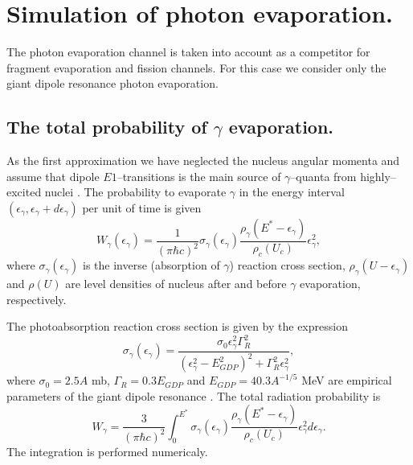 \section{Simulation of photon evaporation.}

\hspace{1.0em}The photon evaporation channel 
is taken into account as a competitor for fragment evaporation
and fission channels. For this case we consider only the giant 
dipole resonance photon 
evaporation.


\subsection{The total probability of $\gamma$ evaporation.}
\hspace{1.0em}As the first approximation we have neglected the nucleus 
angular momenta and 
 assume that 
 dipole $E1$--transitions is the main source of $\gamma$--quanta from 
highly--excited nuclei \cite{Iljinov92}.
The probability to evaporate $\gamma$
 in the energy interval $(\epsilon_{\gamma}, \epsilon_{\gamma}+d\epsilon_{\gamma})$ 
 per unit of time is given
\begin{equation}
\label{SPE7}W_{\gamma}(\epsilon_{\gamma}) =
 \frac{1}{(\pi \hbar c)^2}\sigma_{\gamma}(\epsilon_{\gamma})
\frac{\rho_{\gamma}(E^{*}-\epsilon_{\gamma})}
{\rho_c(U_c)}\epsilon^2_{\gamma},
\end{equation}
where $\sigma_{\gamma}(\epsilon_{\gamma})$ is the inverse (absorption of  $\gamma$)
reaction cross section, 
$\rho_{\gamma}(U-\epsilon_{\gamma})$ and $\rho(U)$ are level densities of nucleus after and
before $\gamma$ evaporation, respectively.

The photoabsorption reaction cross section is given by the expression
\begin{equation}
\label{SPE8} 
\sigma _{\gamma}(\epsilon_{\gamma}) = 
\frac{\sigma_0 \epsilon^2_{\gamma} \Gamma^2_{R}}
{(\epsilon^2_{\gamma} - E_{GDP}^2)^2 + \Gamma^2_R\epsilon^2_{\gamma}},
\end{equation}
where $\sigma_0=2.5A$ mb, $\Gamma_R=0.3E_{GDP}$ and $E_{GDP}= 40.3 A^{-1/5}$ MeV are 
empirical parameters of the giant dipole resonance \cite{Iljinov92}.
The total radiation probability is
\begin{equation}
\label{SPE9}W_{\gamma} =\frac{3}{(\pi \hbar c)^2}\int_{0}^{E^{*}}
 \sigma_{\gamma}(\epsilon_{\gamma})
\frac{\rho_{\gamma}(E^{*}-\epsilon_{\gamma})}
{\rho_c(U_c)}\epsilon^2_{\gamma}d\epsilon_{\gamma}.
\end{equation}
The integration is performed numericaly.

